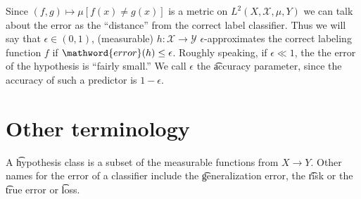 Since $(f, g) \mapsto \mu [f(x) \neq g(x)]$ is a metric on $L^2(X, \mathcal{X} , \mu , Y)$ we can talk about the error as the ``distance'' from the correct label classifier.
Thus we will say that $\epsilon  \in (0, 1)$, (measurable) $h: \mathcal{X}  \to \mathcal{Y} $ \t{$\epsilon $-approximates} the correct labeling function $f$ if $\mathword{error}(h) \leq \epsilon $.
Roughly speaking, if $\epsilon  \ll 1$, the the error of the hypothesis is ``fairly small.''
We call $\epsilon $ the \t{accuracy parameter}, since the accuracy of such a predictor is $1 - \epsilon $.

\section*{Other terminology}

A \t{hypothesis class} is a subset of the measurable functions from $X \to Y$.
Other names for the error of a classifier include the \t{generalization error}, the \t{risk} or the \t{true error} or \t{loss}.
